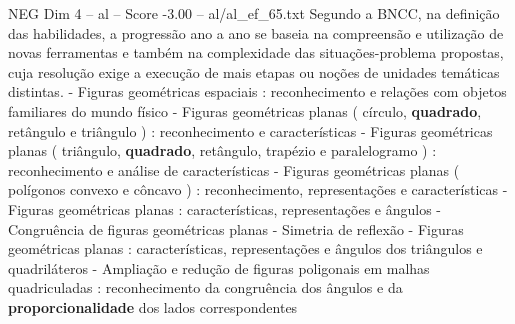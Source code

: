 \begin{textsample}{NEG Dim 4 – al – Score -3.00 – al/al\_ef\_65.txt}
Segundo a BNCC, na definição das habilidades, a progressão ano a ano se baseia na compreensão e utilização de novas ferramentas e também na complexidade das situações-problema propostas, cuja resolução exige a execução de mais etapas ou noções de unidades temáticas distintas. - Figuras geométricas espaciais : reconhecimento e relações com objetos familiares do mundo físico - Figuras geométricas planas ( círculo, \textbf{quadrado}, retângulo e triângulo ) : reconhecimento e características - Figuras geométricas planas ( triângulo, \textbf{quadrado}, retângulo, trapézio e paralelogramo ) : reconhecimento e análise de características - Figuras geométricas planas ( polígonos convexo e côncavo ) : reconhecimento, representações e características - Figuras geométricas planas : características, representações e ângulos - Congruência de figuras geométricas planas - Simetria de reflexão - Figuras geométricas planas : características, representações e ângulos dos triângulos e quadriláteros - Ampliação e redução de figuras poligonais em malhas quadriculadas : reconhecimento da congruência dos ângulos e da \textbf{proporcionalidade} dos lados correspondentes

\end{textsample}
